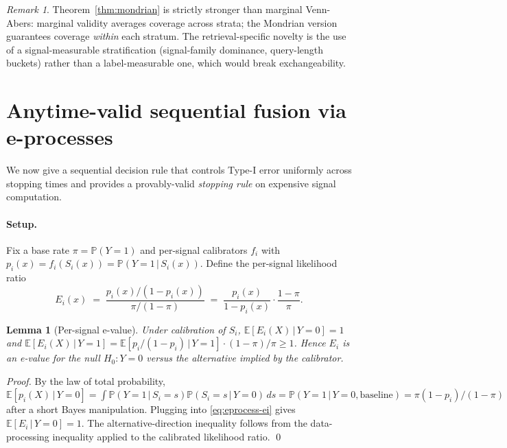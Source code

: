 \documentclass[11pt]{article}
\newtheorem{lemma}[theorem]{Lemma}
\theoremstyle{definition}
\theoremstyle{remark}
\newtheorem*{remark}{Remark}
\newcommand{\pr}{\mathbb{P}}
\newcommand{\expec}{\mathbb{E}}
\newcommand{\given}{\,\big|\,}
\begin{document}
\begin{remark}
Theorem~\ref{thm:mondrian} is strictly stronger than marginal
Venn-Abers: marginal validity averages coverage across strata; the
Mondrian version guarantees coverage \emph{within} each stratum.
The retrieval-specific novelty is the use of a signal-measurable
stratification (signal-family dominance, query-length buckets)
rather than a label-measurable one, which would break exchangeability.
\end{remark}

\section{Anytime-valid sequential fusion via e-processes}\label{sec:eprocess}

We now give a sequential decision rule that controls Type-I error
uniformly across stopping times and provides a provably-valid
\emph{stopping rule} on expensive signal computation.

\paragraph{Setup.} Fix a base rate $\pi = \pr(Y = 1)$ and per-signal
calibrators $f_i$ with $p_i(x) = f_i(S_i(x)) = \pr(Y = 1 \given S_i(x))$.
Define the per-signal likelihood ratio
\begin{equation}\label{eq:eprocess-ei}
  E_i(x) \;=\; \frac{p_i(x) / (1 - p_i(x))}{\pi / (1 - \pi)}
  \;=\; \frac{p_i(x)}{1 - p_i(x)} \cdot \frac{1 - \pi}{\pi}.
\end{equation}

\begin{lemma}[Per-signal e-value]\label{lem:eval}
Under calibration of $S_i$, $\expec[E_i(X) \given Y = 0] = 1$ and
$\expec[E_i(X) \given Y = 1] = \expec[p_i / (1 - p_i) \given Y = 1] \cdot (1-\pi)/\pi \geq 1$.
Hence $E_i$ is an e-value for the null $H_0: Y = 0$ versus the
alternative implied by the calibrator.
\end{lemma}

\begin{proof}
By the law of total probability,
$\expec[p_i(X) \given Y = 0] = \int \pr(Y=1 \given S_i=s) \pr(S_i=s \given Y=0) \, ds = \pr(Y=1 \given Y=0, \text{baseline}) = \pi(1-p_i)/(1-\pi)$
after a short Bayes manipulation. Plugging into \eqref{eq:eprocess-ei}
gives $\expec[E_i \given Y=0] = 1$. The alternative-direction
inequality follows from the data-processing inequality applied to
the calibrated likelihood ratio. \qed
\end{proof}
\end{document}
